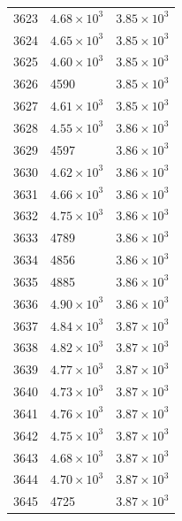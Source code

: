 \begin{table}[H]
\begin{tabular}{lll}
3623 & $\displaystyle 4.68 \times 10^{3}$ & $\displaystyle 3.85 \times 10^{3}$ \\
3624 & $\displaystyle 4.65 \times 10^{3}$ & $\displaystyle 3.85 \times 10^{3}$ \\
3625 & $\displaystyle 4.60 \times 10^{3}$ & $\displaystyle 3.85 \times 10^{3}$ \\
3626 & 4590 & $\displaystyle 3.85 \times 10^{3}$ \\
3627 & $\displaystyle 4.61 \times 10^{3}$ & $\displaystyle 3.85 \times 10^{3}$ \\
3628 & $\displaystyle 4.55 \times 10^{3}$ & $\displaystyle 3.86 \times 10^{3}$ \\
3629 & 4597 & $\displaystyle 3.86 \times 10^{3}$ \\
3630 & $\displaystyle 4.62 \times 10^{3}$ & $\displaystyle 3.86 \times 10^{3}$ \\
3631 & $\displaystyle 4.66 \times 10^{3}$ & $\displaystyle 3.86 \times 10^{3}$ \\
3632 & $\displaystyle 4.75 \times 10^{3}$ & $\displaystyle 3.86 \times 10^{3}$ \\
3633 & 4789 & $\displaystyle 3.86 \times 10^{3}$ \\
3634 & 4856 & $\displaystyle 3.86 \times 10^{3}$ \\
3635 & 4885 & $\displaystyle 3.86 \times 10^{3}$ \\
3636 & $\displaystyle 4.90 \times 10^{3}$ & $\displaystyle 3.86 \times 10^{3}$ \\
3637 & $\displaystyle 4.84 \times 10^{3}$ & $\displaystyle 3.87 \times 10^{3}$ \\
3638 & $\displaystyle 4.82 \times 10^{3}$ & $\displaystyle 3.87 \times 10^{3}$ \\
3639 & $\displaystyle 4.77 \times 10^{3}$ & $\displaystyle 3.87 \times 10^{3}$ \\
3640 & $\displaystyle 4.73 \times 10^{3}$ & $\displaystyle 3.87 \times 10^{3}$ \\
3641 & $\displaystyle 4.76 \times 10^{3}$ & $\displaystyle 3.87 \times 10^{3}$ \\
3642 & $\displaystyle 4.75 \times 10^{3}$ & $\displaystyle 3.87 \times 10^{3}$ \\
3643 & $\displaystyle 4.68 \times 10^{3}$ & $\displaystyle 3.87 \times 10^{3}$ \\
3644 & $\displaystyle 4.70 \times 10^{3}$ & $\displaystyle 3.87 \times 10^{3}$ \\
3645 & 4725 & $\displaystyle 3.87 \times 10^{3}$ \\

\end{tabular}
\end{table}
